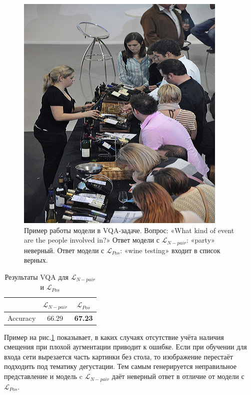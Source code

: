\documentclass[a4paper, 14pt]{article}
\begin{document}
\begin{figure}[!ht]
    \begin{center}
    \includegraphics[scale = 0.85]{Pictures/image_3.png}
    \caption{Пример работы модели в VQA-задаче. Вопрос: «What kind of event are the people involved in?» Ответ модели с $\mathcal{L}_{N-pair}$: «party» неверный. Ответ модели с $\mathcal{L}_{Pos}$: «wine testing» входит в список верных.}
    \label{fg:vqa_1}
    \end{center}
\end{figure}

\begin{table}[!ht]
\begin{center}
\caption{Результаты VQA для $\mathcal{L}_{N-pair}$ и $\mathcal{L}_{Pos}$}
\begin{tabular}{| c | c | c |}
\hline
& $\mathcal{L}_{N-pair}$ & $\mathcal{L}_{Pos}$ \\ \hline
Accuracy & 66.29 & \textbf{67.23} \\ \hline
\end{tabular}
\label{res_vqa}
\end{center}
\end{table}

Пример на рис.\ref{fg:vqa_1} показывает, в каких случаях отсутствие учёта наличия смещения при плохой аугментации приводит к ошибке. Если при обучении для входа сети вырезается часть картинки без стола, то изображение перестаёт подходить под тематику дегустации. Тем самым генерируется неправильное представление и модель c $\mathcal{L}_{N-pair}$ даёт неверный ответ в отличие от модели с $\mathcal{L}_{Pos}$.
\end{document}
